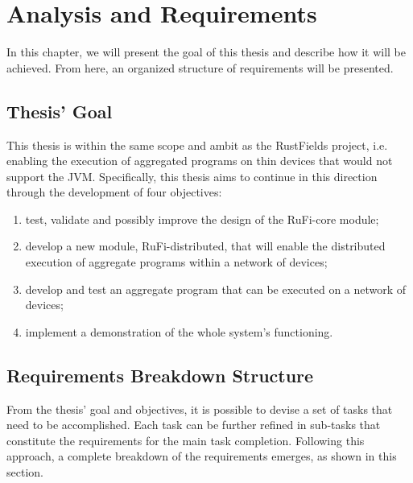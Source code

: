 
\chapter{Analysis and Requirements}
\label{chap:requirements}
In this chapter, we will present the goal of this thesis and describe how it will be achieved. From here, an organized structure of requirements will be presented.

\section{Thesis' Goal}
\label{sec:goal}
This thesis is within the same scope and ambit as the RustFields project, i.e. enabling the execution of aggregated programs on thin devices that would not support the JVM.
Specifically, this thesis aims to continue in this direction through the development of four objectives:

\begin{enumerate}
    \item \label{obj:1} test, validate and possibly improve the design of the RuFi-core module;
    \item \label{obj:2} develop a new module, RuFi-distributed, that will enable the distributed execution of aggregate programs within a network of devices;
    \item \label{obj:3} develop and test an aggregate program that can be executed on a network of devices;
    \item \label{obj:4} implement a demonstration of the whole system's functioning.
\end{enumerate}

\section{Requirements Breakdown Structure}
\label{sec:rbs}
From the thesis' goal and objectives, it is possible to devise a set of tasks that need to be accomplished. Each task can be further refined in sub-tasks that constitute the requirements for the main task completion.
Following this approach, a complete breakdown of the requirements emerges, as shown in this section.

